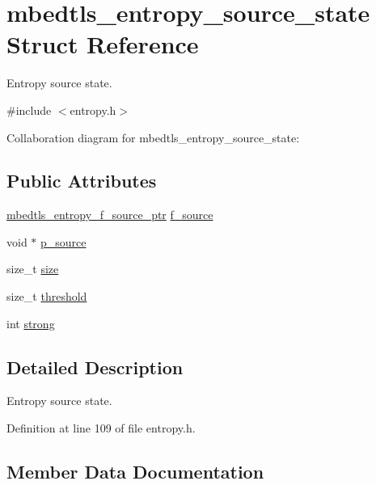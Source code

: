 \hypertarget{structmbedtls__entropy__source__state}{}\section{mbedtls\+\_\+entropy\+\_\+source\+\_\+state Struct Reference}
\label{structmbedtls__entropy__source__state}


Entropy source state.  




{\ttfamily \#include $<$entropy.\+h$>$}



Collaboration diagram for mbedtls\+\_\+entropy\+\_\+source\+\_\+state\+:
\subsection*{Public Attributes}
\begin{DoxyCompactItemize}
\item 
\mbox{\hyperlink{entropy_8h_a2168f0720e2e869e440fd7fa35c941bd}{mbedtls\+\_\+entropy\+\_\+f\+\_\+source\+\_\+ptr}} \mbox{\hyperlink{structmbedtls__entropy__source__state_afa26f990bd3ae555a84bdee710fd5844}{f\+\_\+source}}
\item 
void $\ast$ \mbox{\hyperlink{structmbedtls__entropy__source__state_ac290f929e3382e26443b6625ab9a0d78}{p\+\_\+source}}
\item 
size\+\_\+t \mbox{\hyperlink{structmbedtls__entropy__source__state_a395d9641c3aa0cddd5b1977c9e2a6aba}{size}}
\item 
size\+\_\+t \mbox{\hyperlink{structmbedtls__entropy__source__state_ab5ac92f3c7acd5a47ee986fb915e9686}{threshold}}
\item 
int \mbox{\hyperlink{structmbedtls__entropy__source__state_a13f749f23a93d986357832477335ec83}{strong}}
\end{DoxyCompactItemize}


\subsection{Detailed Description}
Entropy source state. 

Definition at line 109 of file entropy.\+h.



\subsection{Member Data Documentation}
\mbox{\label{structmbedtls__entropy__source__state_afa26f990bd3ae555a84bdee710fd5844}} 
